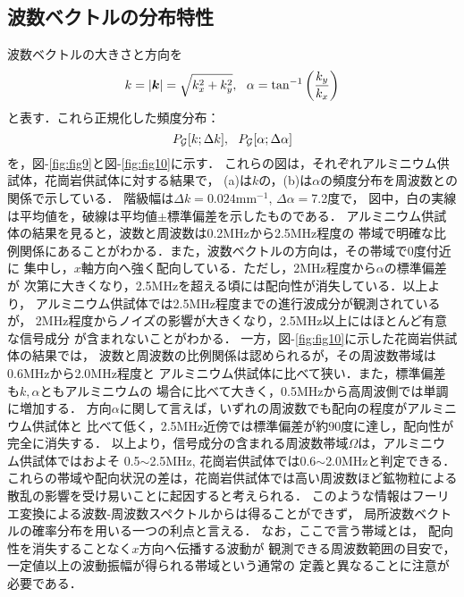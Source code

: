 \subsection{波数ベクトルの分布特性}
波数ベクトルの大きさと方向を
\begin{equation}
	k=\left| \fat{k} \right|=\sqrt{k_x^2+k_y^2},  \ \ 
	\alpha = \tan^{-1} \left( \frac{k_y}{k_x} \right)
	\label{eqn:kpol}
\end{equation}
と表す．これら正規化した頻度分布：
\[
	P_{\cal G}[k;\Delta k], \ \ 
	P_{\cal G}[\alpha;\Delta \alpha]
\]
を，図-\ref{fig:fig9}と図-\ref{fig:fig10}に示す．
これらの図は，それぞれアルミニウム供試体，花崗岩供試体に対する結果で，
(a)は$k$の，(b)は$\alpha$の頻度分布を周波数との関係で示している．
階級幅は$\Delta k=0.024$mm$^{-1}$, $\Delta \alpha=$7.2度で，
図中，白の実線は平均値を，破線は平均値$\pm$標準偏差を示したものである．
アルミニウム供試体の結果を見ると，波数と周波数は0.2MHzから2.5MHz程度の
帯域で明確な比例関係にあることがわかる．また，波数ベクトルの方向は，その帯域で0度付近に
集中し，$x$軸方向へ強く配向している．ただし，2MHz程度から$\alpha$の標準偏差が
次第に大きくなり，2.5MHzを超える頃には配向性が消失している．以上より，
アルミニウム供試体では2.5MHz程度までの進行波成分が観測されているが，
2MHz程度からノイズの影響が大きくなり，2.5MHz以上にはほとんど有意な信号成分
が含まれないことがわかる．
一方，図-\ref{fig:fig10}に示した花崗岩供試体の結果では，
波数と周波数の比例関係は認められるが，その周波数帯域は0.6MHzから2.0MHz程度と
アルミニウム供試体に比べて狭い．また，標準偏差も$k,\alpha$ともアルミニウムの
場合に比べて大きく，0.5MHzから高周波側では単調に増加する．
方向$\alpha$に関して言えば，いずれの周波数でも配向の程度がアルミニウム供試体と
比べて低く，2.5MHz近傍では標準偏差が約90度に達し，配向性が完全に消失する．
以上より，信号成分の含まれる周波数帯域$\Omega$は，アルミニウム供試体ではおよそ
0.5$\sim$2.5MHz, 花崗岩供試体では0.6$\sim$2.0MHzと判定できる．
これらの帯域や配向状況の差は，花崗岩供試体では高い周波数ほど鉱物粒による
散乱の影響を受け易いことに起因すると考えられる．
%
このような情報はフーリエ変換による波数-周波数スペクトルからは得ることができず，
局所波数ベクトルの確率分布を用いる一つの利点と言える．
なお，ここで言う帯域とは， 配向性を消失することなく$x$方向へ伝播する波動が
観測できる周波数範囲の目安で，一定値以上の波動振幅が得られる帯域という通常の
定義と異なることに注意が必要である．
